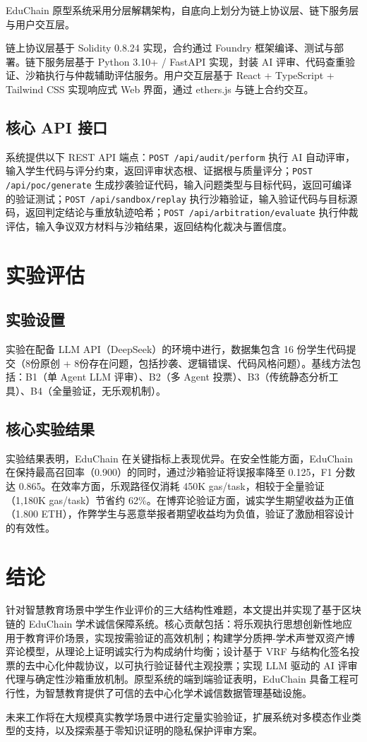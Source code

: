 \documentclass[10pt,twocolumn]{ctexart}
\begin{document}
EduChain 原型系统采用分层解耦架构，自底向上划分为链上协议层、链下服务层与用户交互层。

链上协议层基于 Solidity 0.8.24 实现，合约通过 Foundry 框架编译、测试与部署。链下服务层基于 Python 3.10+ / FastAPI 实现，封装 AI 评审、代码查重验证、沙箱执行与仲裁辅助评估服务。用户交互层基于 React + TypeScript + Tailwind CSS 实现响应式 Web 界面，通过 ethers.js 与链上合约交互。

\subsection{核心 API 接口}

系统提供以下 REST API 端点：\texttt{POST /api/audit/perform} 执行 AI 自动评审，输入学生代码与评分约束，返回评审状态根、证据根与质量评分；\texttt{POST /api/poc/generate} 生成抄袭验证代码，输入问题类型与目标代码，返回可编译的验证测试；\texttt{POST /api/sandbox/replay} 执行沙箱验证，输入验证代码与目标源码，返回判定结论与重放轨迹哈希；\texttt{POST /api/arbitration/evaluate} 执行仲裁评估，输入争议双方材料与沙箱结果，返回结构化裁决与置信度。

\section{实验评估}

\subsection{实验设置}

实验在配备 LLM API（DeepSeek）的环境中进行，数据集包含 16 份学生代码提交（8份原创 + 8份存在问题，包括抄袭、逻辑错误、代码风格问题）。基线方法包括：B1（单 Agent LLM 评审）、B2（多 Agent 投票）、B3（传统静态分析工具）、B4（全量验证，无乐观机制）。

\subsection{核心实验结果}

实验结果表明，EduChain 在关键指标上表现优异。在安全性能方面，EduChain 在保持最高召回率（0.900）的同时，通过沙箱验证将误报率降至 0.125，F1 分数达 0.865。在效率方面，乐观路径仅消耗 450K gas/task，相较于全量验证（1,180K gas/task）节省约 62\%。在博弈论验证方面，诚实学生期望收益为正值（1.800 ETH），作弊学生与恶意举报者期望收益均为负值，验证了激励相容设计的有效性。

\section{结论}

针对智慧教育场景中学生作业评价的三大结构性难题，本文提出并实现了基于区块链的 EduChain 学术诚信保障系统。核心贡献包括：将乐观执行思想创新性地应用于教育评价场景，实现按需验证的高效机制；构建学分质押-学术声誉双资产博弈论模型，从理论上证明诚实行为构成纳什均衡；设计基于 VRF 与结构化签名投票的去中心化仲裁协议，以可执行验证替代主观投票；实现 LLM 驱动的 AI 评审代理与确定性沙箱重放机制。原型系统的端到端验证表明，EduChain 具备工程可行性，为智慧教育提供了可信的去中心化学术诚信数据管理基础设施。

未来工作将在大规模真实教学场景中进行定量实验验证，扩展系统对多模态作业类型的支持，以及探索基于零知识证明的隐私保护评审方案。
\end{document}
